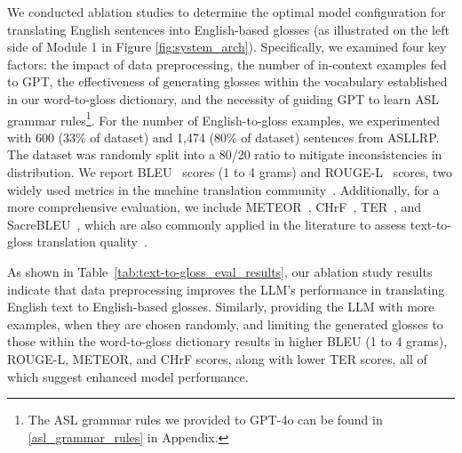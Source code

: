 We conducted ablation studies to determine the optimal model configuration for translating English sentences into English-based glosses (as illustrated on the left side of Module 1 in Figure \ref{fig:system_arch}). Specifically, we examined four key factors: the impact of data preprocessing, the number of in-context examples fed to GPT, the effectiveness of generating glosses within the vocabulary established in our word-to-gloss dictionary, and the necessity of guiding GPT to learn ASL grammar rules\footnote{The ASL grammar rules we provided to GPT-4o can be found in \ref{asl_grammar_rules} in Appendix.}. For the number of English-to-gloss examples, we experimented with 600 (33\% of dataset) and 1,474 (80\% of dataset) sentences from ASLLRP. The dataset was randomly split into a 80/20 ratio to mitigate inconsistencies in distribution. We report BLEU~\cite{papineni_bleu_2002} scores (1 to 4 grams) and ROUGE-L~\cite{lin_rouge_2004} scores, two widely used metrics in the machine translation community~\cite{baltatzis2024neural,saunders_progressive_2020,saunders2020adversarial,fang2024signllm}. Additionally, for a more comprehensive evaluation, we include METEOR~\cite{banerjee_meteor_2005}, CHrF~\cite{popovic_chrf_2015}, TER~\cite{snover_study_2006}, and SacreBLEU~\cite{post2018call}, which are also commonly applied in the literature to assess text-to-gloss translation quality~\cite{egea_gomez_syntax-aware_2021,zhu_neural_2023,forster_extensions_nodate}.


As shown in Table~\ref{tab:text-to-gloss_eval_results}, our ablation study results indicate that data preprocessing improves the LLM's performance in translating English text to English-based glosses. Similarly, providing the LLM with more examples, when they are chosen randomly, and limiting the generated glosses to those within the word-to-gloss dictionary results in higher BLEU (1 to 4 grams), ROUGE-L, METEOR, and CHrF scores, along with lower TER scores, all of which suggest enhanced model performance. 

 

